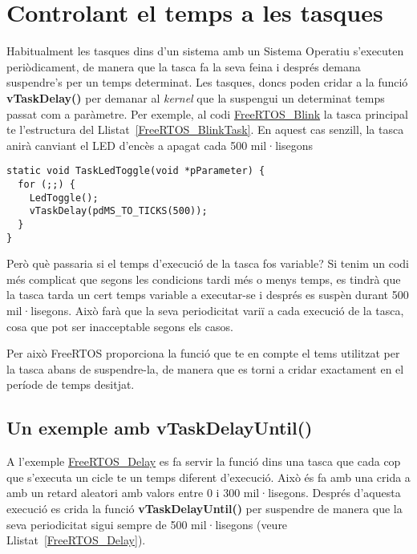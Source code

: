 \chapter{Controlant el temps a les tasques}
Habitualment les tasques dins d'un sistema amb un Sistema Operatiu s'executen periòdicament, de manera que la tasca fa la seva feina i després demana suspendre's per un temps determinat. Les tasques, doncs poden cridar a la funció {\bf vTaskDelay()} per demanar al {\em kernel} que la suspengui un determinat temps passat com a paràmetre. Per exemple, al codi \href{https://github.com/mariusmm/cursembedded/tree/master/Simplicity/FreeRTOS_Blink}{FreeRTOS\_Blink} la tasca principal te l'estructura del Llistat~\ref{FreeRTOS_BlinkTask}. En aquest cas senzill, la tasca anirà canviant el LED d'encès a apagat cada 500 mil·lisegons

\begin{lstlisting}[style=customc, label=FreeRTOS_BlinkTask, caption=Tasca de l'exemple FreeRTOS\_BlinkTask]
static void TaskLedToggle(void *pParameter) {
  for (;;) {
    LedToggle();
    vTaskDelay(pdMS_TO_TICKS(500));
  }
}
\end{lstlisting}

Però què passaria si el temps d'execució de la tasca fos variable? Si tenim un codi més complicat que segons les condicions tardi més o menys temps, es tindrà que la tasca tarda un cert temps variable a executar-se i després es suspèn durant 500 mil·lisegons. Això farà que la seva periodicitat variï a cada execució de la tasca, cosa que pot ser inacceptable segons els casos.

Per això FreeRTOS proporciona la funció  que te en compte el tems utilitzat per la tasca abans de suspendre-la, de manera que es torni a cridar exactament en el període de temps desitjat.

\section{Un exemple amb vTaskDelayUntil()}

A l'exemple \href{https://github.com/mariusmm/cursembedded/tree/master/Simplicity/FreeRTOS_Delay}{FreeRTOS\_Delay} es fa servir la funció  dins una tasca que cada cop que s'executa un cicle te un temps diferent d'execució. Això és fa amb una crida a  amb un retard aleatori amb valors entre 0 i 300 mil·lisegons. 
Després d'aquesta execució es crida la funció {\bf vTaskDelayUntil()} per suspendre de manera que la seva periodicitat sigui sempre de 500 mil·lisegons (veure Llistat~\ref{FreeRTOS_Delay}). 


